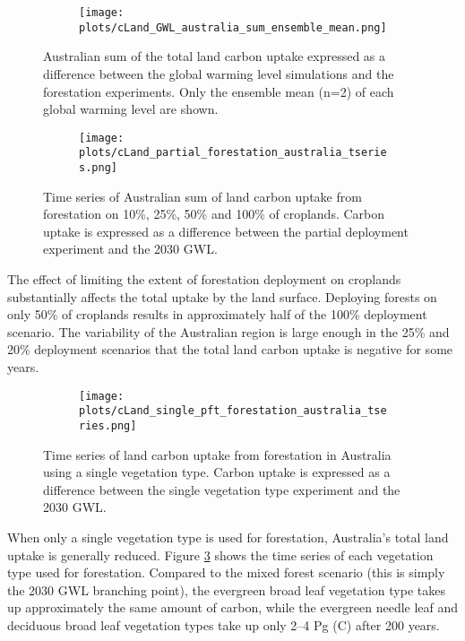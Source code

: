 \documentclass[]{article}
\begin{document}
\begin{figure}[H]
    \centering
    \begin{subfigure}[b]{\linewidth}
        \texttt{[image: plots/cLand\_GWL\_australia\_sum\_ensemble\_mean.png]}
    \end{subfigure}
    \caption{Australian sum of the total land carbon uptake expressed as a difference between the global warming level simulations and the forestation experiments. Only the ensemble mean (n=2) of each global warming level are shown.}
    \label{fig:australia_cLand}
\end{figure}

\begin{figure}[H]
    \centering
    \begin{subfigure}[b]{\linewidth}
        \texttt{[image: plots/cLand\_partial\_forestation\_australia\_tseries.png]}
    \end{subfigure}
    \caption{Time series of Australian sum of land carbon uptake from forestation on 10\%, 25\%, 50\% and 100\% of croplands. Carbon uptake is expressed as a difference between the partial deployment experiment and the 2030 GWL.}
    \label{fig:australia_cLand_tseries}
\end{figure}

The effect of limiting the extent of forestation deployment on croplands substantially affects the total uptake by the land surface.
Deploying forests on only 50\% of croplands results in approximately half of the 100\% deployment scenario.
The variability of the Australian region is large enough in the 25\% and 20\% deployment scenarios that the total land carbon uptake is negative for some years.

\begin{figure}[H]
    \centering
    \begin{subfigure}[b]{\linewidth}
        \texttt{[image: plots/cLand\_single\_pft\_forestation\_australia\_tseries.png]}
    \end{subfigure}
    \caption{Time series of land carbon uptake from forestation in Australia using a single vegetation type. Carbon uptake is expressed as a difference between the single vegetation type experiment and the 2030 GWL.}
    \label{fig:australia_cLand_tseries_veg_type}
\end{figure}

When only a single vegetation type is used for forestation, Australia's total land uptake is generally reduced.
Figure \ref{fig:australia_cLand_tseries_veg_type} shows the time series of each vegetation type used for forestation.
Compared to the mixed forest scenario (this is simply the 2030 GWL branching point), the evergreen broad leaf vegetation type takes up approximately the same amount of carbon, while the evergreen needle leaf and deciduous broad leaf vegetation types take up only 2--4 Pg (C) after 200 years.
\end{document}
